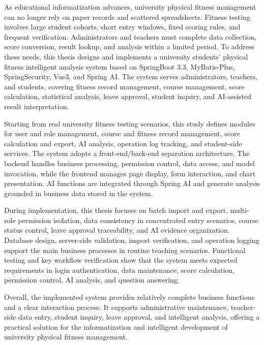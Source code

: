\begin{englishabstract}

As educational informatization advances, university physical fitness management can no longer rely on paper records and scattered spreadsheets. Fitness testing involves large student cohorts, short entry windows, fixed scoring rules, and frequent verification. Administrators and teachers must complete data collection, score conversion, result lookup, and analysis within a limited period. To address these needs, this thesis designs and implements a university students' physical fitness intelligent analysis system based on SpringBoot 3.3, MyBatis-Plus, SpringSecurity, Vue3, and Spring AI. The system serves administrators, teachers, and students, covering fitness record management, course management, score calculation, statistical analysis, leave approval, student inquiry, and AI-assisted result interpretation.

Starting from real university fitness testing scenarios, this study defines modules for user and role management, course and fitness record management, score calculation and export, AI analysis, operation log tracking, and student-side services. The system adopts a front-end/back-end separation architecture. The backend handles business processing, permission control, data access, and model invocation, while the frontend manages page display, form interaction, and chart presentation. AI functions are integrated through Spring AI and generate analysis grounded in business data stored in the system.

During implementation, this thesis focuses on batch import and export, multi-role permission isolation, data consistency in concentrated entry scenarios, course status control, leave approval traceability, and AI evidence organization. Database design, server-side validation, import verification, and operation logging support the main business processes in routine teaching scenarios. Functional testing and key workflow verification show that the system meets expected requirements in login authentication, data maintenance, score calculation, permission control, AI analysis, and question answering.

Overall, the implemented system provides relatively complete business functions and a clear interaction process. It supports administrative maintenance, teacher-side data entry, student inquiry, leave approval, and intelligent analysis, offering a practical solution for the informatization and intelligent development of university physical fitness management.

\end{englishabstract}
